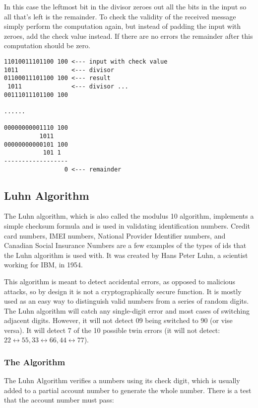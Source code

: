 \documentclass{article}
\begin{document}
In this case the leftmost bit in the divisor zeroes out all the bits in the input so all that's left is the remainder.
To check the validity of the received message simply perform the computation again, but instead of padding the input
with zeroes, add the check value instead. If there are no errors the remainder after this computation should be zero.
\begin{verbatim}
11010011101100 100 <--- input with check value
1011               <--- divisor
01100011101100 100 <--- result
 1011              <--- divisor ...
00111011101100 100

......
  
00000000001110 100
          1011
00000000000101 100 
           101 1
------------------
                 0 <--- remainder
\end{verbatim}


\subsection{Luhn Algorithm}
The Luhn algorithm, which is also called the modulus 10 algorithm, implements a simple
checksum formula and is used in validating identification numbers. Credit card numbers, IMEI
numbers, National Provider Identifier numbers, and Canadian Social Insurance Numbers are a
few examples of the types of ids that the Luhn algorithm is used with. It was created by
Hans Peter Luhn, a scientist working for IBM, in 1954.

This algorithm is meant to detect accidental errors, as opposed to malicious attacks, so by
design it is not a cryptographically secure function. It is mostly used as an easy way to
distinguish valid numbers from a series of random digits.
The Luhn algorithm will catch any single-digit error and most cases of switching
adjacent digits. However, it will not detect 09 being switched to 90 (or vise versa).
It will detect 7 of the 10 possible twin errors (it will not detect: $22 \leftrightarrow 55,
33 \leftrightarrow 66, 44 \leftrightarrow 77$).

\subsubsection{The Algorithm}
The Luhn Algorithm verifies a numbers using its check digit, which is usually
added to a partial account number to generate the whole number. There is a
test that the account number must pass:
\end{document}
